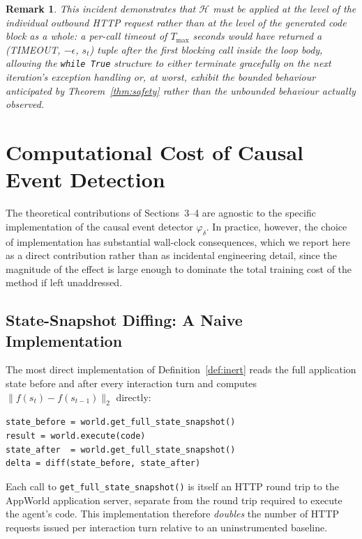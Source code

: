 \documentclass[11pt]{article}
\newtheorem{remark}{Remark}
\begin{document}
\begin{remark}
This incident demonstrates that $\mathcal{H}$ must be applied at the level of
the individual outbound HTTP request rather than at the level of the
generated code block as a whole: a per-call timeout of $T_{\max}$ seconds
would have returned a (TIMEOUT, $-\epsilon$, $s_t$) tuple after the first
blocking call inside the loop body, allowing the \texttt{while True} structure
to either terminate gracefully on the next iteration's exception handling or,
at worst, exhibit the bounded behaviour anticipated by
Theorem~\ref{thm:safety} rather than the unbounded behaviour actually
observed.
\end{remark}

\section{Computational Cost of Causal Event Detection}
\label{sec:infra}

The theoretical contributions of Sections~3--4 are agnostic to the specific
implementation of the causal event detector $\varphi_\delta$. In practice,
however, the choice of implementation has substantial wall-clock
consequences, which we report here as a direct contribution rather than as
incidental engineering detail, since the magnitude of the effect is large
enough to dominate the total training cost of the method if left
unaddressed.

\subsection{State-Snapshot Diffing: A Naive Implementation}

The most direct implementation of Definition~\ref{def:inert} reads the full
application state before and after every interaction turn and computes
$\|f(s_t) - f(s_{t-1})\|_2$ directly:

\begin{verbatim}
state_before = world.get_full_state_snapshot()
result = world.execute(code)
state_after  = world.get_full_state_snapshot()
delta = diff(state_before, state_after)
\end{verbatim}

Each call to \texttt{get\_full\_state\_snapshot()} is itself an HTTP round
trip to the AppWorld application server, separate from the round trip
required to execute the agent's code. This implementation therefore
\emph{doubles} the number of HTTP requests issued per interaction turn
relative to an uninstrumented baseline.
\end{document}
